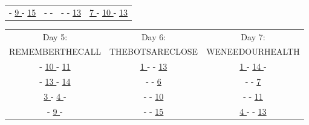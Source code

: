 \documentclass{article}
\begin{document}
\begin{center}
\begin{tabular}{ c  c  c  c }
 \underline{ \hspace{.1in} } - \underline{ 9 } - \underline{ 15 }&  
 \underline{ \hspace{.1in} } - \underline{ \hspace{.1in} } - \underline{ \hspace{.1in} } &  
 \underline{ \hspace{.1in} } - \underline{ \hspace{.1in} } - \underline{ 13 } &  
 \underline{ 7 } - \underline{ 10 } - \underline{ 13 }\\
 
\end{tabular}
\end{center}

\vspace{2em}

\begin{center}
\begin{tabular}{ c  c  c }
Day 5: & Day 6: & Day 7: \\
REMEMBERTHECALL & THEBOTSARECLOSE & WENEEDOURHEALTH   \\

  
 \underline{ \hspace{.1in} } - \underline{ 10 } - \underline{ 11 } &  
 \underline{ 1 } - \underline{ \hspace{.1in} } - \underline{ 13 } &  
\underline{ 1 } - \underline{ 14 } - \underline{ \hspace{.1in} } \\
 
\underline{ \hspace{.1in} } - \underline{ 13 } - \underline{ 14 }&
\underline{ \hspace{.1in} } - \underline{ \hspace{.1in} } - \underline{ 6 } &  
\underline{ \hspace{.1in} } - \underline{ \hspace{.1in} } - \underline{ 7 } \\
 
 \underline{ 3 } - \underline{ 4 } - \underline{ \hspace{.1in} }&  
\fbox{ \phantom{X} }  - \underline{ \hspace{.1in} } - \underline{ 10 } &  
 \underline{ \hspace{.1in} } - \underline{ \hspace{.1in} } - \underline{ 11 } \\
 
\fbox{ \phantom{X} }  - \underline{ 9 } - \underline{ \hspace{.1in} }&  
 \underline{ \hspace{.1in} } - \underline{ \hspace{.1in} } - \underline{ 15 } &  
 \underline{ 4 } - \fbox{ \phantom{X} } - \underline{ 13 } \\
 

\end{tabular}
\end{center}
\end{document}
